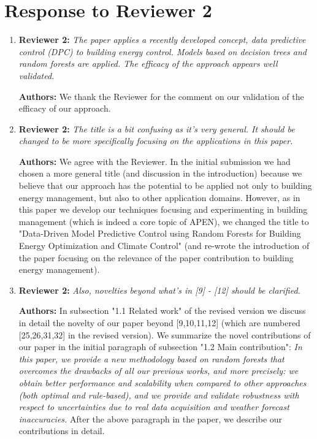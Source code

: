 \documentclass{article}
\begin{document}
\section{Response to Reviewer 2}



\begin{enumerate}

\item \textbf{Reviewer 2:} \textit{The paper applies a recently developed concept, data predictive control (DPC) to building energy control. Models based on decision trees and random forests are applied. The efficacy of the approach appears well validated.}



\textbf{Authors:} We thank the Reviewer for the comment on our validation of the efficacy of our approach.



\item \textbf{Reviewer 2:} \textit{The title is a bit confusing as it's very general. It should be changed to be more specifically focusing on the applications in this paper.}



\textbf{Authors:} We agree with the Reviewer. In the initial submission we had chosen a more general title (and discussion in the introduction) because we believe that our approach has the potential to be applied not only to building energy management, but also to other application domains. However, as in this paper we develop our techniques focusing and experimenting in building management (which is indeed a core topic of APEN), we changed the title to "Data-Driven Model Predictive Control using Random Forests for Building Energy Optimization and Climate Control" (and re-wrote the introduction of the paper focusing on the relevance of the paper contribution to building energy management). 



\item \textbf{Reviewer 2:} \textit{Also, novelties beyond what's in [9] - [12] should be clarified.}



\textbf{Authors:} In subsection "1.1 Related work" of the revised version we discuss in detail the novelty of our paper beyond [9,10,11,12] (which are numbered [25,26,31,32] in the revised version). We summarize the novel contributions of our paper in the initial paragraph of subsection "1.2 Main contribution":
\textit{In this paper, we provide a new methodology based on random forests that overcomes the drawbacks of all our previous works, and more precisely: we obtain better performance and scalability when compared to other approaches (both optimal and rule-based), and we provide and validate robustness with respect to uncertainties due to real data acquisition and weather forecast inaccuracies.}
After the above paragraph in the paper, we describe our contributions in detail.




\end{enumerate}
\end{document}
